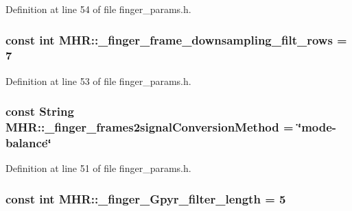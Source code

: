 Definition at line 54 of file finger\+\_\+params.\+h.

\hypertarget{namespace_m_h_r_a5d49af784fd77df019705d26d3654953}{
\subsubsection[{\+\_\+finger\+\_\+frame\+\_\+downsampling\+\_\+filt\+\_\+rows}]{\setlength{\rightskip}{0pt plus 5cm}const int M\+H\+R\+::\+\_\+finger\+\_\+frame\+\_\+downsampling\+\_\+filt\+\_\+rows = 7}}\label{namespace_m_h_r_a5d49af784fd77df019705d26d3654953}


Definition at line 53 of file finger\+\_\+params.\+h.

\hypertarget{namespace_m_h_r_a4c571f87fe52934440add1a3a5a98e14}{
\subsubsection[{\+\_\+finger\+\_\+frames2signal\+Conversion\+Method}]{\setlength{\rightskip}{0pt plus 5cm}const String M\+H\+R\+::\+\_\+finger\+\_\+frames2signal\+Conversion\+Method = \char`\"{}mode-\/balance\char`\"{}}}\label{namespace_m_h_r_a4c571f87fe52934440add1a3a5a98e14}


Definition at line 51 of file finger\+\_\+params.\+h.

\hypertarget{namespace_m_h_r_a5b1bf691aa0c1246b140b3f67580c229}{
\subsubsection[{\+\_\+finger\+\_\+\+Gpyr\+\_\+filter\+\_\+length}]{\setlength{\rightskip}{0pt plus 5cm}const int M\+H\+R\+::\+\_\+finger\+\_\+\+Gpyr\+\_\+filter\+\_\+length = 5}}\label{namespace_m_h_r_a5b1bf691aa0c1246b140b3f67580c229}


